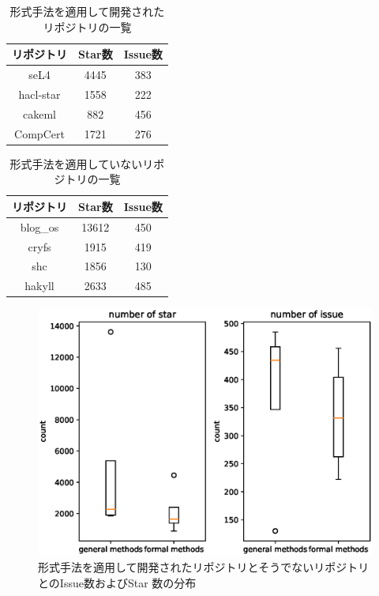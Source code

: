 \documentclass[main]{subfiles}
\begin{document}

\begin{table}[p]
	\centering
	\caption{形式手法を適用して開発されたリポジトリの一覧}
	\label{tab:repository_formal}
	\begin{tabular}{ccc} %
		\hline
		リポジトリ & Star数 & Issue数 \\\hline
		seL4       & 4445   & 383     \\
		hacl-star  & 1558   & 222     \\
		cakeml     & 882    & 456     \\
		CompCert   & 1721   & 276     \\\hline
	\end{tabular}
\end{table}

\begin{table}[p]
	\centering
	\caption{形式手法を適用していないリポジトリの一覧}
	\label{tab:repository_common}
	\begin{tabular}{ccc} %
		\hline
		リポジトリ & Star数 & Issue数 \\\hline
		blog\_os   & 13612  & 450     \\
		cryfs      & 1915   & 419     \\
		shc        & 1856   & 130     \\
		hakyll     & 2633   & 485     \\\hline

	\end{tabular}
\end{table}


\begin{figure}[p]
	\centering
	\includegraphics[width=\hsize]{figures/boxplot.eps}
	\caption{形式手法を適用して開発されたリポジトリとそうでないリポジトリとのIssue数およびStar
	数の分布}
	\label{fig:boxplot}
\end{figure}

\end{document}
